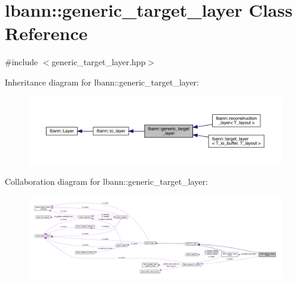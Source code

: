\hypertarget{classlbann_1_1generic__target__layer}{}\section{lbann\+:\+:generic\+\_\+target\+\_\+layer Class Reference}
\label{classlbann_1_1generic__target__layer}


{\ttfamily \#include $<$generic\+\_\+target\+\_\+layer.\+hpp$>$}



Inheritance diagram for lbann\+:\+:generic\+\_\+target\+\_\+layer\+:\nopagebreak
\begin{figure}[H]
\begin{center}
\leavevmode
\includegraphics[width=350pt]{classlbann_1_1generic__target__layer__inherit__graph}
\end{center}
\end{figure}


Collaboration diagram for lbann\+:\+:generic\+\_\+target\+\_\+layer\+:\nopagebreak
\begin{figure}[H]
\begin{center}
\leavevmode
\includegraphics[width=350pt]{classlbann_1_1generic__target__layer__coll__graph}
\end{center}
\end{figure}
